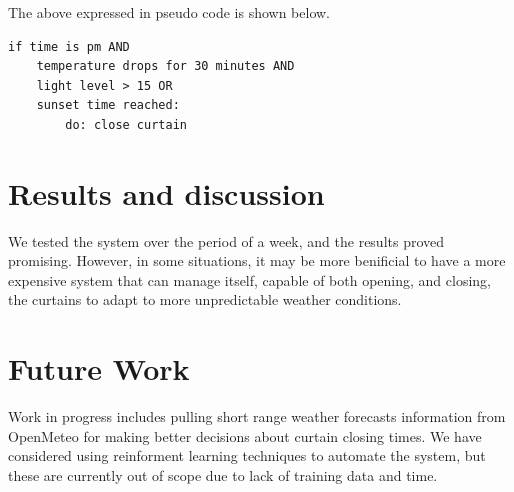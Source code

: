 \documentclass[a4paper,12pt]{article}
\begin{document}
The above expressed in pseudo code is shown below.

\begin{verbatim}
if time is pm AND 
    temperature drops for 30 minutes AND 
    light level > 15 OR 
    sunset time reached:
        do: close curtain
\end{verbatim}

\section{Results and discussion}

We tested the system over the period of a week, and the results proved promising. 
However, in some situations, it may be more benificial to have a more expensive system that can manage itself, capable of both opening, and closing, the curtains 
to adapt to more unpredictable weather conditions.


\section{Future Work}

Work in progress includes pulling short range weather forecasts information from OpenMeteo\cite{url:openmeteo} for making better decisions 
about curtain closing times.
We have considered using reinforment learning techniques to automate the system, but these are currently out of scope due to lack of training 
data and time.
\end{document}
